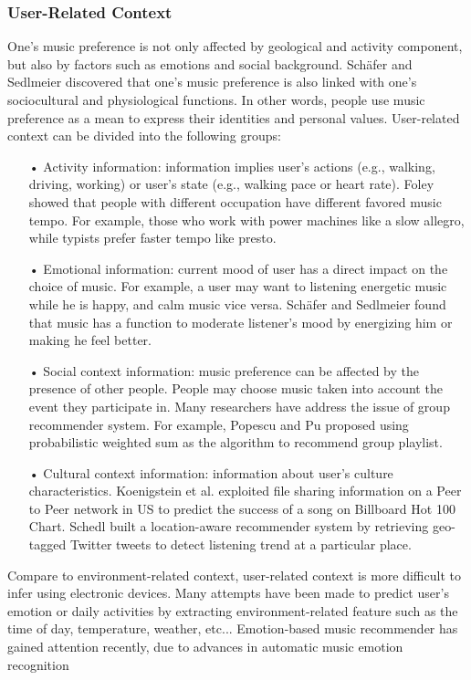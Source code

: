 \subsubsection{User-Related Context}
One's music preference is not only affected by geological and activity component, but also by factors such as emotions and social background. Sch{\"a}fer and Sedlmeier \cite{schafer2009functions} discovered that one's music preference is also linked with one's sociocultural and physiological functions. In other words, people use music preference as a mean to express their identities and personal values. User-related context can be divided into the following groups:

\begin{itemize}
\item[•] Activity information: information implies user's actions (e.g., walking, driving, working) or user's state (e.g., walking pace or heart rate). Foley \cite{foley1940occupational} showed that people with different occupation have different favored music tempo. For example, those who work with power machines like a slow allegro, while typists prefer faster tempo like presto. 
\item[•] Emotional information: current mood of user has a direct impact on the choice of music. For example, a user may want to listening energetic music while he is happy, and calm music vice versa. Sch{\"a}fer and Sedlmeier \cite{schafer2009functions} found that music has a function to moderate listener's mood by energizing him or making he feel better.
\item[•] Social context information: music preference can be affected by the presence of other people. People may choose music taken into account the event they participate in. Many researchers have address the issue of group recommender system. For example, Popescu and Pu \cite{popescu2011probabilistic} proposed using probabilistic weighted sum as the algorithm to recommend group playlist.
\item[•] Cultural context information: information about user's culture characteristics. Koenigstein et al. \cite{koenigstein2009predicting} exploited file sharing information on a Peer to Peer network in US to predict the success of a song on Billboard Hot 100 Chart. Schedl \cite{schedl2013leveraging} built a location-aware recommender system by retrieving geo-tagged Twitter tweets to detect listening trend at a particular place. 
\end{itemize}

Compare to environment-related context, user-related context is more difficult to infer using electronic devices. Many attempts have been made to predict user's emotion or daily activities \cite{park2006context} \cite{wang2012context} by extracting environment-related feature such as the time of day, temperature, weather, etc... Emotion-based music recommender has gained attention recently, due to advances in automatic music emotion recognition \cite{yang2012machine}

